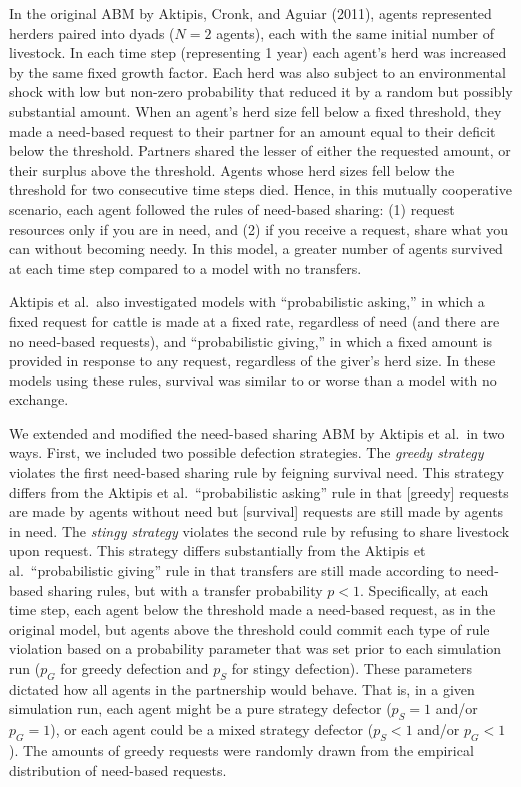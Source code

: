\documentclass[
]{article}
\begin{document}
In the original ABM by Aktipis, Cronk, and Aguiar (2011), agents represented herders paired into dyads (\(N=2\) agents), each with the same initial number of livestock. In each time step (representing 1 year) each agent's herd was increased by the same fixed growth factor. Each herd was also subject to an environmental shock with low but non-zero probability that reduced it by a random but possibly substantial amount. When an agent's herd size fell below a fixed threshold, they made a need-based request to their partner for an amount equal to their deficit below the threshold. Partners shared the lesser of either the requested amount, or their surplus above the threshold. Agents whose herd sizes fell below the threshold for two consecutive time steps died. Hence, in this mutually cooperative scenario, each agent followed the rules of need-based sharing: (1) request resources only if you are in need, and (2) if you receive a request, share what you can without becoming needy. In this model, a greater number of agents survived at each time step compared to a model with no transfers.

Aktipis et al.~also investigated models with ``probabilistic asking,'' in which a fixed request for cattle is made at a fixed rate, regardless of need (and there are no need-based requests), and ``probabilistic giving,'' in which a fixed amount is provided in response to any request, regardless of the giver's herd size. In these models using these rules, survival was similar to or worse than a model with no exchange.

We extended and modified the need-based sharing ABM by Aktipis et al.~in two ways. First, we included two possible defection strategies. The \emph{greedy strategy} violates the first need-based sharing rule by feigning survival need. This strategy differs from the Aktipis et al.~``probabilistic asking'' rule in that {[}greedy{]} requests are made by agents without need but {[}survival{]} requests are still made by agents in need. The \emph{stingy strategy} violates the second rule by refusing to share livestock upon request. This strategy differs substantially from the Aktipis et al.~``probabilistic giving'' rule in that transfers are still made according to need-based sharing rules, but with a transfer probability \(p<1\). Specifically, at each time step, each agent below the threshold made a need-based request, as in the original model, but agents above the threshold could commit each type of rule violation based on a probability parameter that was set prior to each simulation run (\(p_G\) for greedy defection and \(p_S\) for stingy defection). These parameters dictated how all agents in the partnership would behave. That is, in a given simulation run, each agent might be a pure strategy defector (\(p_S=1\) and/or \(p_G=1\)), or each agent could be a mixed strategy defector (\(p_S<1\) and/or \(p_G<1\)). The amounts of greedy requests were randomly drawn from the empirical distribution of need-based requests.
\end{document}
